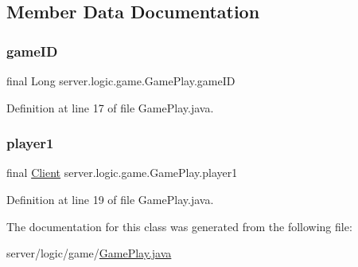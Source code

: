 \subsection{Member Data Documentation}
\hypertarget{classserver_1_1logic_1_1game_1_1_game_play_aa22d053ec69172e85fb15661c90ec4cc}{}\label{classserver_1_1logic_1_1game_1_1_game_play_aa22d053ec69172e85fb15661c90ec4cc} 
\subsubsection{\texorpdfstring{game\+ID}{gameID}}
{\footnotesize\ttfamily final Long server.\+logic.\+game.\+Game\+Play.\+game\+ID}



Definition at line 17 of file Game\+Play.\+java.

\hypertarget{classserver_1_1logic_1_1game_1_1_game_play_a16d7db4931bbedeccb0cf1dbe5c8f193}{}\label{classserver_1_1logic_1_1game_1_1_game_play_a16d7db4931bbedeccb0cf1dbe5c8f193} 
\subsubsection{\texorpdfstring{player1}{player1}}
{\footnotesize\ttfamily final \hyperlink{classserver_1_1conn_1_1_client}{Client} server.\+logic.\+game.\+Game\+Play.\+player1}



Definition at line 19 of file Game\+Play.\+java.



The documentation for this class was generated from the following file\+:\begin{DoxyCompactItemize}
\item 
server/logic/game/\hyperlink{_game_play_8java}{Game\+Play.\+java}\end{DoxyCompactItemize}
